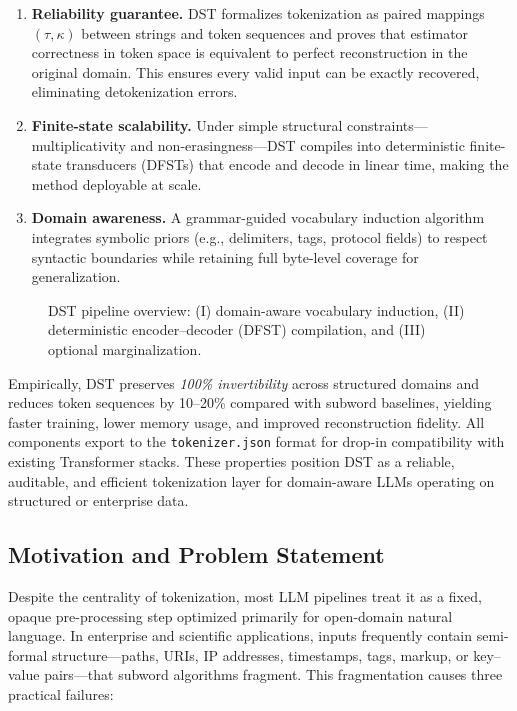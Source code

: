 \begin{enumerate}
    \item \textbf{Reliability guarantee.}
    DST formalizes tokenization as paired mappings $(\tau,\kappa)$ between strings and token sequences and proves that estimator correctness in token space is equivalent to perfect reconstruction in the original domain.
    This ensures every valid input can be exactly recovered, eliminating detokenization errors.
    \item \textbf{Finite-state scalability.}
    Under simple structural constraints---multiplicativity and non-erasingness---DST compiles into deterministic finite-state transducers (DFSTs) that encode and decode in linear time, making the method deployable at scale.
    \item \textbf{Domain awareness.}
    A grammar-guided vocabulary induction algorithm integrates symbolic priors (e.g., delimiters, tags, protocol fields) to respect syntactic boundaries while retaining full byte-level coverage for generalization.
\end{enumerate}

\begin{figure}[t]
  \centering
  \setlength{\fboxsep}{0pt}\fbox{\rule{0pt}{120pt}\rule{240pt}{0pt}}
  \caption{DST pipeline overview: (I) domain-aware vocabulary induction, (II) deterministic encoder–decoder (DFST) compilation, and (III) optional marginalization.}
  \label{fig:dst_pipeline}
\end{figure}

Empirically, DST preserves \emph{100\% invertibility} across structured domains and reduces token sequences by 10--20\% compared with subword baselines, yielding faster training, lower memory usage, and improved reconstruction fidelity.
All components export to the \texttt{tokenizer.json} format for drop-in compatibility with existing Transformer stacks.
These properties position DST as a reliable, auditable, and efficient tokenization layer for domain-aware LLMs operating on structured or enterprise data.

\subsection{Motivation and Problem Statement}

Despite the centrality of tokenization, most LLM pipelines treat it as a fixed, opaque pre-processing step optimized primarily for open-domain natural language.
In enterprise and scientific applications, inputs frequently contain semi-formal structure—paths, URIs, IP addresses, timestamps, tags, markup, or key–value pairs—that subword algorithms fragment.
This fragmentation causes three practical failures:

